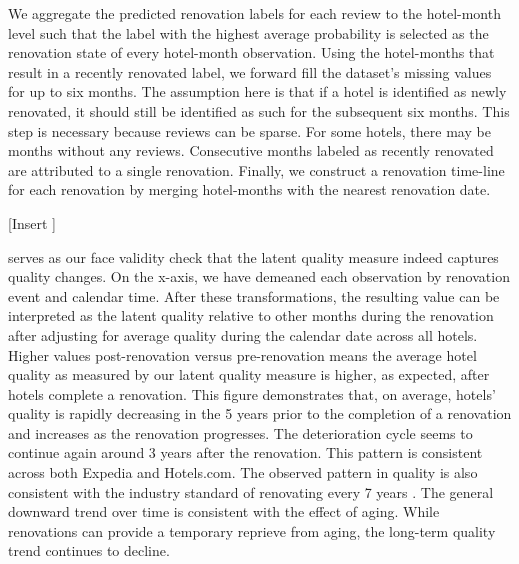 \documentclass{informs_mod} %
\begin{document}
We aggregate the predicted renovation labels for each review to the hotel-month level such that the label with the highest average probability is selected as the renovation state of every hotel-month observation. Using the hotel-months that result in a recently renovated label, we forward fill the dataset's missing values for up to six months. The assumption here is that if a hotel is identified as newly renovated, it should still be identified as such for the subsequent six months. This step is necessary because reviews can be sparse. For some hotels, there may be months without any reviews. Consecutive months labeled as recently renovated are attributed to a single renovation. Finally, we construct a renovation time-line for each renovation by merging hotel-months with the nearest renovation date. 

[Insert ]

 serves as our face validity check that the latent quality measure indeed captures quality changes. On the x-axis, we have demeaned each observation by renovation event and calendar time. After these transformations, the resulting value can be interpreted as the latent quality relative to other months during the renovation after adjusting for average quality during the calendar date across all hotels. Higher values post-renovation versus pre-renovation means the average hotel quality as measured by our latent quality measure is higher, as expected, after hotels complete a renovation. This figure demonstrates that, on average, hotels' quality is rapidly decreasing in the 5 years prior to the completion of a renovation and increases as the renovation progresses. The deterioration cycle seems to continue again around 3 years after the renovation. This pattern is consistent across both Expedia and Hotels.com. The observed pattern in quality is also consistent with the industry standard of renovating every 7 years \citep{renofreq2008}. The general downward trend over time is consistent with the effect of aging. While renovations can provide a temporary reprieve from aging, the long-term quality trend continues to decline. 
\end{document}
